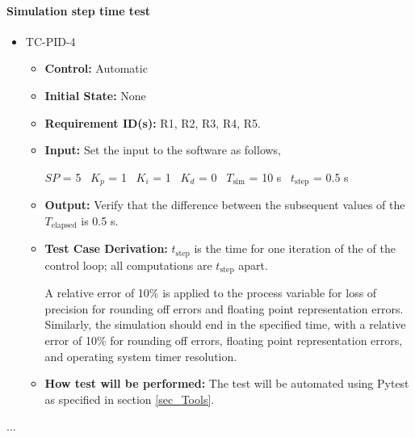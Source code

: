 \documentclass[12pt, titlepage]{article}
\begin{document}
\paragraph{Simulation step time test}

\begin{itemize}
\item{TC-PID-4\\}
\begin{itemize}

\item{\textbf{Control:}} Automatic
					
\item{\textbf{Initial State:}} None

\item{\textbf{Requirement ID(s):}}  R1, R2, R3, R4, R5.
					
\item{\textbf{Input:}} Set the input to the software as follows,

$SP$ = 5
~\newline$K_p$ = 1
~\newline$K_i$ = 1
~\newline$K_d$ = 0
~\newline$T_\text{sim}$ = 10 s
~\newline$t_\text{step}$ = 0.5 s
					
\item{\textbf{Output:}}  Verify that the difference between the subsequent values of the 
$T_\text{elapsed}$ is 0.5 s.

\item{\textbf{Test Case Derivation:}}  $t_\text{step}$ is the time for one iteration of the of the
control loop; all computations are $t_\text{step}$ apart.

A relative error of 10\% is applied to the process variable for loss
of precision for rounding off errors and floating point representation
errors. Similarly, the simulation should end in the specified time, with a 
relative error of 10\% for rounding off errors, floating point 
representation errors, and operating system timer resolution.


\item{\textbf{How test will be performed:}}  The test will be automated using Pytest as specified in 
section \ref{sec_Tools}.

\end{itemize}
\end{itemize}
...
\end{document}
